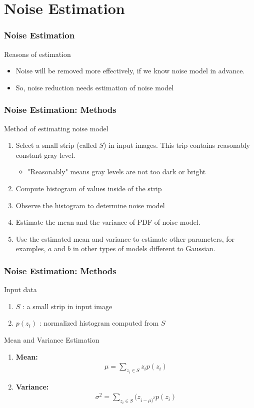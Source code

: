 \documentclass[english,11pt,table,handout]{beamer}
\begin{document}
\section{Noise Estimation}
\frame
{
	\frametitle{Noise Estimation}
	\begin{alertblock}{Reasons of estimation}
		\begin{itemize}
			\item Noise will be removed more effectively, if we know noise model in advance.
			\item So, noise reduction needs estimation of noise model
		\end{itemize}
	\end{alertblock}
}

\frame
{
	\frametitle{Noise Estimation: Methods}
	\begin{block}{Method of estimating noise model}
		\begin{enumerate}
			\item Select a small strip (called $S$) in input images. This trip contains reasonably constant gray level.
				\begin{itemize}
					\item "Reasonably" means gray levels are not too dark or bright
				\end{itemize}
			\item Compute histogram of values inside of the strip
			\item Observe the histogram to determine noise model
			\item Estimate the mean and the variance of PDF of noise model.
			\item Use the estimated mean and variance to estimate other parameters, for examples, $a$ and $b$ in other types of models different to Gaussian.
		\end{enumerate}
	\end{block}

}
\frame
{
	\frametitle{Noise Estimation: Methods}
	\begin{block}{Input data}
		\begin{enumerate}
			\item $S$ : a small strip in input image
			\item $p(z_i)$ : normalized histogram computed from $S$
		\end{enumerate}
	\end{block}
	\begin{alertblock}{Mean and Variance Estimation}
		\begin{enumerate}
			\item \alert{\textbf{Mean:}}
			\begin{align}
			\nonumber
			\mu = \sum_{z_i \in S}{z_{i}p(z_{i})}
			\end{align}
			
			\item \alert{\textbf{Variance:}}
			\begin{align}
			\nonumber
			\sigma^2 = \sum_{z_i \in S}{(z_{i-\mu)^2}p(z_{i})}
			\end{align}
		\end{enumerate}
	\end{alertblock}
}
\end{document}
